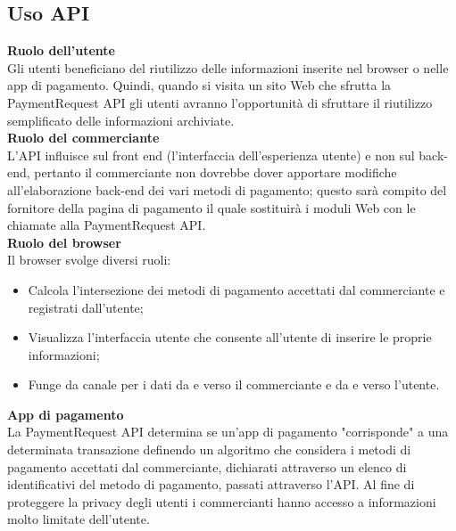 \documentclass[11pt ,a4paper , twoside , openright ]{book}
\begin{document}
	\subsection{Uso API}
	\textbf{Ruolo dell'utente}
	\\
	Gli utenti beneficiano del riutilizzo delle informazioni inserite nel browser o nelle app di pagamento. Quindi, quando si visita un sito Web che sfrutta la PaymentRequest API gli utenti avranno l'opportunità di sfruttare il riutilizzo semplificato delle informazioni archiviate.
	\\
	\textbf{Ruolo del commerciante}
	\\
	L'API influisce sul front end (l'interfaccia dell'esperienza utente) e non sul back-end, pertanto il commerciante non dovrebbe dover apportare modifiche all'elaborazione back-end dei vari metodi di pagamento; questo sarà compito del fornitore della pagina di pagamento il quale sostituirà i moduli Web con le chiamate alla PaymentRequest API.
	\\
	\textbf{Ruolo del browser}
	\\
	Il browser svolge diversi ruoli:
	\begin{itemize}
		\item Calcola l'intersezione dei metodi di pagamento accettati dal commerciante e registrati dall'utente;
		\item Visualizza l'interfaccia utente che consente all'utente di inserire le proprie informazioni;
		\item Funge da canale per i dati da e verso il commerciante e da e verso l'utente.
	\end{itemize}
	\textbf{App di pagamento}
	\\
	La PaymentRequest API determina se un'app di pagamento "corrisponde" a una determinata transazione definendo un algoritmo che considera i metodi di pagamento accettati dal commerciante, dichiarati attraverso un elenco di identificativi del metodo di pagamento, passati attraverso l'API.
	Al fine di proteggere la privacy degli utenti i commercianti hanno accesso a informazioni molto limitate dell'utente. 
	
\end{document}
